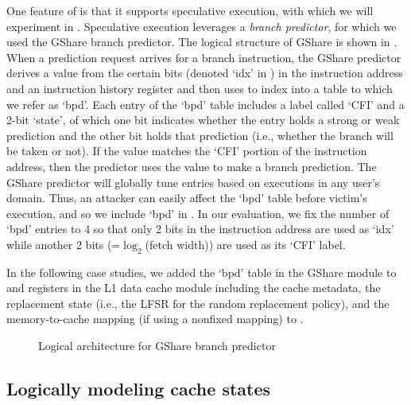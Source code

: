 One feature of \boom is that it supports speculative execution, with
which we will experiment in .  Speculative
execution leverages a \textit{branch predictor}, for which we used the
GShare branch predictor.  The logical structure of GShare is shown in
. When a prediction request arrives for a branch
instruction, the GShare predictor derives a value \bpdIdx from the
certain bits (denoted `idx' in ) in the instruction
address and an instruction history register and then uses \bpdIdx to
index into a table to which we refer as `bpd'.  Each entry of the
`bpd' table includes a label called `CFI' and a 2-bit `state', of
which one bit indicates whether the entry holds a strong or weak
prediction and the other bit holds that prediction (i.e., whether the
branch will be taken or not).  If the \bpdCFI{\bpdIdx} value matches
the `CFI' portion of the instruction address, then the predictor uses
the \bpdState{\bpdIdx} value to make a branch prediction.  The GShare
predictor will globally tune entries based on executions in any user's
domain. Thus, an attacker can easily affect the `bpd' table before
victim's execution, and so we include `bpd' in \ACIKeys. In our
evaluation, we fix the number of `bpd' entries to 4 so that only 2
bits in the instruction address are used as `idx' while another 2 bits
(=$\log_2$(fetch width)) are used as its `CFI' label.

In the following case studies, we added the `bpd' table in the GShare
module to \ACIKeys and registers in the L1 data cache module including
the cache metadata, the replacement state (i.e., the \gls{LFSR} for
the random replacement policy), and the memory-to-cache mapping (if
using a nonfixed mapping) to \AIIKeys.

\begin{figure}[t]
\centering
\resizebox{0.7\linewidth}{!}{\protect\small}
\caption{Logical architecture for GShare branch predictor}
\label{fig:gshare}
\end{figure}

\subsection{Logically modeling cache states}

